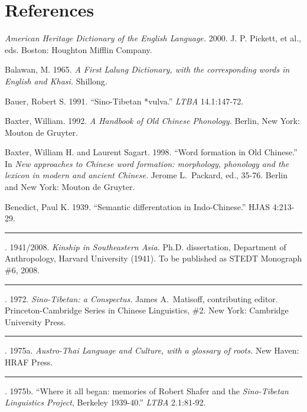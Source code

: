 \renewcommand\thefootnote{}
\chapter[References]{References\footnotemark}
\newcommand{\refitem}{\hangindent=0.25in}
\newcommand{\rrefline}{\rule[3pt]{3em}{0.5pt}. } %
\label{pg:start-refs}

\refitem
\textit{American Heritage Dictionary of the English Language.}
2000.
J. P. Pickett, et al., eds. Boston: Houghton Mifflin Company.

\refitem
Balawan, M.
1965.
\textit{A First Lalung Dictionary, with the corresponding words in English and Khasi.}
Shillong.

\refitem
Bauer, Robert S.
1991.
“Sino-Tibetan *vulva.”
\textit{LTBA} 14.1:147-72.

\refitem
Baxter, William.
1992.
\textit{A Handbook of Old Chinese Phonology.}
Berlin, New York: Mouton de Gruyter.

\refitem
Baxter, William H. and Laurent Sagart.
1998.
“Word formation in Old Chinese.”
In \textit{New approaches to Chinese word formation: morphology, phonology and the lexicon in modern and ancient Chinese.} Jerome L.\ Packard, ed., 35-76. Berlin and New York: Mouton de Gruyter.

\refitem
Benedict, Paul K.
1939.
“Semantic differentation in Indo-Chinese.”
HJAS 4:213-29.

\refitem
\rrefline %
1941/2008.
\textit{Kinship in Southeastern Asia.}
Ph.D. dissertation, Department of Anthropology, Harvard University (1941). To be published as STEDT Monograph \#6, 2008.

\refitem
\rrefline %
1972.
\textit{Sino-Tibetan: a Conspectus.}
James A.\ Matisoff, contributing editor. Princeton-Cambridge Series in Chinese Linguistics, \#2.  New York: Cambridge University Press.

\refitem
\rrefline %
1975a.
\textit{Austro-Thai Language and Culture, with a glossary of roots.}
New Haven: HRAF Press.

\refitem
\rrefline %
1975b.
“Where it all began: memories of Robert Shafer and the \textit{Sino-Tibetan Linguistics Project}, Berkeley 1939-40.”
\textit{LTBA} 2.1:81-92.

